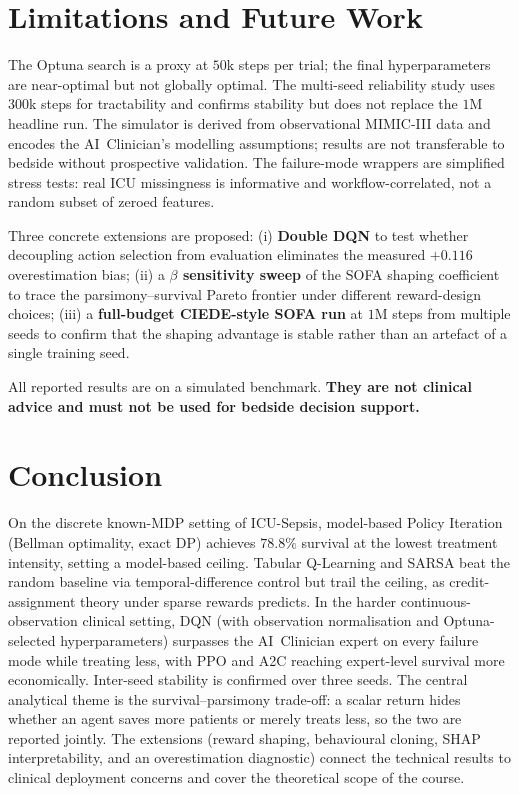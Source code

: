 \documentclass[11pt,a4paper]{article}
\begin{document}
\section{Limitations and Future Work}
\label{sec:limits}

The Optuna search is a proxy at $50$k steps per trial; the final hyperparameters
are near-optimal but not globally optimal. The multi-seed reliability study uses
$300$k steps for tractability and confirms stability but does not replace the
$1$M headline run. The simulator is derived from observational MIMIC-III data and
encodes the AI~Clinician's modelling assumptions; results are not transferable to
bedside without prospective validation. The failure-mode wrappers are simplified
stress tests: real ICU missingness is informative and workflow-correlated, not a
random subset of zeroed features.

Three concrete extensions are proposed: (i) \textbf{Double DQN} to test whether
decoupling action selection from evaluation eliminates the measured $+0.116$
overestimation bias; (ii) a \textbf{$\beta$ sensitivity sweep} of the SOFA shaping
coefficient to trace the parsimony--survival Pareto frontier under different
reward-design choices; (iii) a \textbf{full-budget CIEDE-style SOFA run} at
$1$M steps from multiple seeds to confirm that the shaping advantage is stable
rather than an artefact of a single training seed.

All reported results are on a simulated benchmark. \textbf{They are not clinical
advice and must not be used for bedside decision support.}


\section{Conclusion}
\label{sec:conc}

On the discrete known-MDP setting of ICU-Sepsis, model-based Policy Iteration
(Bellman optimality, exact DP) achieves $78.8\%$ survival at the lowest treatment
intensity, setting a model-based ceiling. Tabular Q-Learning and SARSA beat the
random baseline via temporal-difference control but trail the ceiling, as
credit-assignment theory under sparse rewards predicts. In the harder
continuous-observation clinical setting, DQN (with observation normalisation and
Optuna-selected hyperparameters) surpasses the AI~Clinician expert on every
failure mode while treating less, with PPO and A2C reaching expert-level survival
more economically. Inter-seed stability is confirmed over three seeds. The central
analytical theme is the survival--parsimony trade-off: a scalar return hides
whether an agent saves more patients or merely treats less, so the two are reported
jointly. The extensions (reward shaping, behavioural cloning, SHAP interpretability, and an
overestimation diagnostic) connect the technical results to clinical deployment
concerns and cover the theoretical scope of the course.
\end{document}
